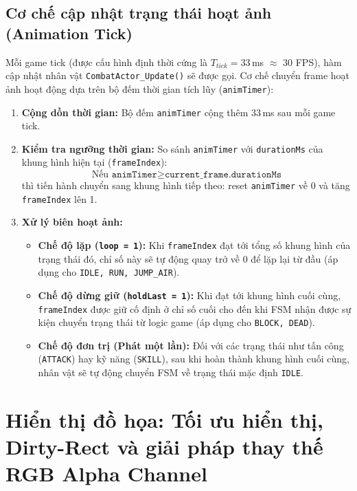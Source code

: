 \documentclass[a4paper,12pt]{report}
\begin{document}
\subsection{Cơ chế cập nhật trạng thái hoạt ảnh (Animation Tick)}

Mỗi game tick (được cấu hình định thời cứng là $T_{tick} = 33$\,ms $\approx$ 30 FPS), hàm cập nhật nhân vật \texttt{CombatActor\_Update()} sẽ được gọi. Cơ chế chuyển frame hoạt ảnh hoạt động dựa trên bộ đếm thời gian tích lũy (\texttt{animTimer}):

\begin{enumerate}
    \item \textbf{Cộng dồn thời gian:} Bộ đếm \texttt{animTimer} cộng thêm $33$\,ms sau mỗi game tick.
    \item \textbf{Kiểm tra ngưỡng thời gian:} So sánh \texttt{animTimer} với \texttt{durationMs} của khung hình hiện tại (\texttt{frameIndex}):
    \[
    \text{Nếu } \texttt{animTimer} \ge \texttt{current\_frame.durationMs}
    \]
    thì tiến hành chuyển sang khung hình tiếp theo: reset \texttt{animTimer} về 0 và tăng \texttt{frameIndex} lên 1.
    \item \textbf{Xử lý biên hoạt ảnh:}
    \begin{itemize}
        \item \textbf{Chế độ lặp (\texttt{loop = 1}):} Khi \texttt{frameIndex} đạt tới tổng số khung hình của trạng thái đó, chỉ số này sẽ tự động quay trở về 0 để lặp lại từ đầu (áp dụng cho \texttt{IDLE, RUN, JUMP\_AIR}).
        \item \textbf{Chế độ dừng giữ (\texttt{holdLast = 1}):} Khi đạt tới khung hình cuối cùng, \texttt{frameIndex} được giữ cố định ở chỉ số cuối cho đến khi FSM nhận được sự kiện chuyển trạng thái từ logic game (áp dụng cho \texttt{BLOCK, DEAD}).
        \item \textbf{Chế độ đơn trị (Phát một lần):} Đối với các trạng thái như tấn công (\texttt{ATTACK}) hay kỹ năng (\texttt{SKILL}), sau khi hoàn thành khung hình cuối cùng, nhân vật sẽ tự động chuyển FSM về trạng thái mặc định \texttt{IDLE}.
    \end{itemize}
\end{enumerate}

\section{Hiển thị đồ họa: Tối ưu hiển thị, Dirty-Rect và giải pháp thay thế RGB Alpha Channel}
\label{sec:graphics}
\end{document}
